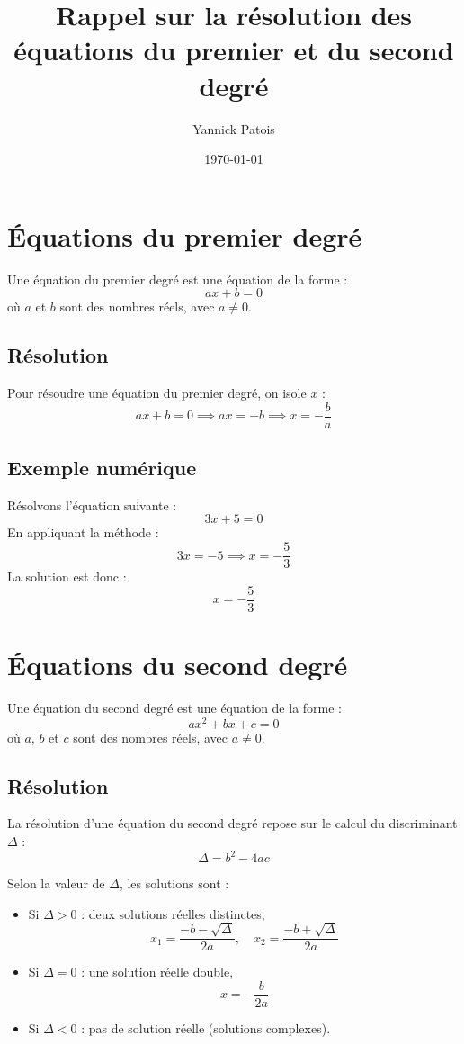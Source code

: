 \documentclass{article}
\title{Rappel sur la résolution des équations du premier et du second degré}
\author{Yannick Patois}
\date{\today}
\begin{document}
\maketitle

\section{Équations du premier degré}

Une équation du premier degré est une équation de la forme :
$$ ax + b = 0 $$
où $a$ et $b$ sont des nombres réels, avec $a \neq 0$.

\subsection{Résolution}

Pour résoudre une équation du premier degré, on isole $x$ :
$$ ax + b = 0 \implies ax = -b \implies x = -\frac{b}{a} $$

\subsection{Exemple numérique}

Résolvons l'équation suivante :
$$ 3x + 5 = 0 $$
En appliquant la méthode :
$$ 3x = -5 \implies x = -\frac{5}{3} $$
La solution est donc :
$$ \boxed{x = -\frac{5}{3}} $$

\section{Équations du second degré}

Une équation du second degré est une équation de la forme :
$$ ax^2 + bx + c = 0 $$
où $a$, $b$ et $c$ sont des nombres réels, avec $a \neq 0$.

\subsection{Résolution}

La résolution d'une équation du second degré repose sur le calcul du discriminant $\Delta$ :
$$ \Delta = b^2 - 4ac $$

Selon la valeur de $\Delta$, les solutions sont :
\begin{itemize}
    \item Si $\Delta > 0$ : deux solutions réelles distinctes,
    $$ x_1 = \frac{-b - \sqrt{\Delta}}{2a}, \quad x_2 = \frac{-b + \sqrt{\Delta}}{2a} $$
    \item Si $\Delta = 0$ : une solution réelle double,
    $$ x = -\frac{b}{2a} $$
    \item Si $\Delta < 0$ : pas de solution réelle (solutions complexes).
\end{itemize}
\end{document}
